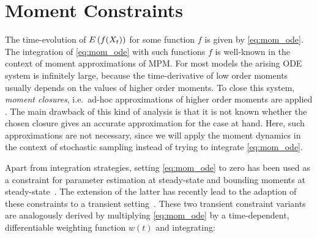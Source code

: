 



\section{Moment Constraints}\label{sec:cv:moments}
The time-evolution of ${E}\left(f(X_t)\right)$ for some function $f$ is given by \eqref{eq:mom_ode}.
The integration of \eqref{eq:mom_ode} with such functions $f$ is well-known in the context of
moment approximations of \ac{MPM}.
For most models the arising \ac{ODE} system is infinitely large, because the time-derivative of
low order moments usually depends on the values of higher order moments.
To close this system, \emph{moment closures}, i.e.\ ad-hoc approximations of higher order moments
are applied \parencite{schnoerr2015}.
The main drawback of this kind of analysis is that it is not known whether the chosen closure gives
an accurate approximation for the case at hand.
Here, such approximations are not necessary, since we will apply the moment dynamics in the context
of stochastic sampling instead of trying to integrate \eqref{eq:mom_ode}.

Apart from integration strategies,
setting \eqref{eq:mom_ode} to zero has been used as a constraint for parameter estimation at steady-state
\parencite{backenkohler2018moment} and bounding moments at steady-state~\parencite{dowdy2018bounds,ghusinga2017exact,kuntz2017rigorous}.
The extension of the latter has recently lead to the adaption of these constraints
to a transient setting~\parencite{dowdy2018dynamic,sakurai2019bounding}.
These two transient constraint variants are analogously derived by multiplying \eqref{eq:mom_ode}
by a time-dependent, differentiable weighting function $w(t)$ and integrating:

